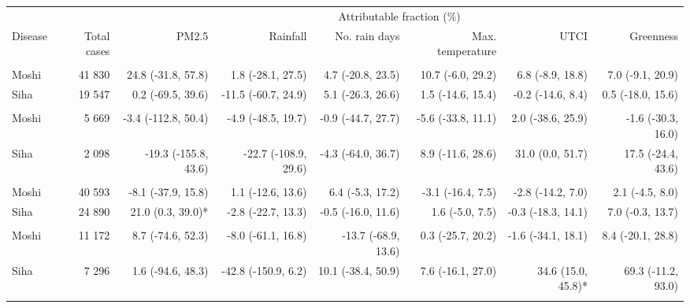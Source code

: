 \begin{table}[t]
\fontsize{12.0pt}{14.4pt}\selectfont
\begin{tabular*}{\linewidth}{@{\extracolsep{\fill}}l|rrrrrrr}
\toprule
 &  & \multicolumn{6}{c}{Attributable fraction (\%)} \\ 
\cmidrule(lr){3-8}
Disease & Total cases & PM2.5 & Rainfall & No. rain days & Max. temperature & UTCI & Greenness \\ 
\midrule\addlinespace[2.5pt]
\multicolumn{8}{l}{Pneumonia, Severe} \\[2.5pt] 
\midrule\addlinespace[2.5pt]
Moshi & 41 830 & 24.8 (-31.8, 57.8)  & 1.8 (-28.1, 27.5)  & 4.7 (-20.8, 23.5)  & 10.7 (-6.0, 29.2)  & 6.8 (-8.9, 18.8)  & 7.0 (-9.1, 20.9)  \\ 
Siha & 19 547 & 0.2 (-69.5, 39.6)  & -11.5 (-60.7, 24.9)  & 5.1 (-26.3, 26.6)  & 1.5 (-14.6, 15.4)  & -0.2 (-14.6, 8.4)  & 0.5 (-18.0, 15.6)  \\ 
\midrule\addlinespace[2.5pt]
\multicolumn{8}{l}{Tuberculosis} \\[2.5pt] 
\midrule\addlinespace[2.5pt]
Moshi & 5 669 & -3.4 (-112.8, 50.4)  & -4.9 (-48.5, 19.7)  & -0.9 (-44.7, 27.7)  & -5.6 (-33.8, 11.1)  & 2.0 (-38.6, 25.9)  & -1.6 (-30.3, 16.0)  \\ 
Siha & 2 098 & -19.3 (-155.8, 43.6)  & -22.7 (-108.9, 29.6)  & -4.3 (-64.0, 36.7)  & 8.9 (-11.6, 28.6)  & 31.0 (0.0, 51.7)  & 17.5 (-24.4, 43.6)  \\ 
\midrule\addlinespace[2.5pt]
\multicolumn{8}{l}{Skin Infection - Fungal} \\[2.5pt] 
\midrule\addlinespace[2.5pt]
Moshi & 40 593 & -8.1 (-37.9, 15.8)  & 1.1 (-12.6, 13.6)  & 6.4 (-5.3, 17.2)  & -3.1 (-16.4, 7.5)  & -2.8 (-14.2, 7.0)  & 2.1 (-4.5, 8.0)  \\ 
Siha & 24 890 & 21.0 (0.3, 39.0)* & -2.8 (-22.7, 13.3)  & -0.5 (-16.0, 11.6)  & 1.6 (-5.0, 7.5)  & -0.3 (-18.3, 14.1)  & 7.0 (-0.3, 13.7)  \\ 
\midrule\addlinespace[2.5pt]
\multicolumn{8}{l}{Malnutrition} \\[2.5pt] 
\midrule\addlinespace[2.5pt]
Moshi & 11 172 & 8.7 (-74.6, 52.3)  & -8.0 (-61.1, 16.8)  & -13.7 (-68.9, 13.6)  & 0.3 (-25.7, 20.2)  & -1.6 (-34.1, 18.1)  & 8.4 (-20.1, 28.8)  \\ 
Siha & 7 296 & 1.6 (-94.6, 48.3)  & -42.8 (-150.9, 6.2)  & 10.1 (-38.4, 50.9)  & 7.6 (-16.1, 27.0)  & 34.6 (15.0, 45.8)* & 69.3 (-11.2, 93.0)  \\ 
\midrule\addlinespace[2.5pt]
\multicolumn{8}{l}{Peptic Ulcers} \\[2.5pt] 

\end{tabular*}
\end{table}
